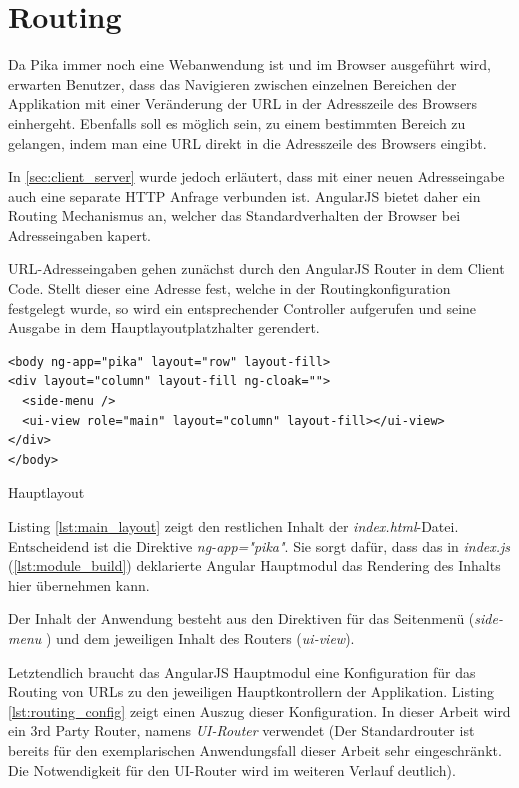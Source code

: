 \section{Routing}
\label{sec:routing}

Da Pika immer noch eine Webanwendung ist und im Browser ausgeführt wird, erwarten Benutzer, dass das Navigieren zwischen einzelnen Bereichen der Applikation mit einer Veränderung der URL in der Adresszeile des Browsers einhergeht. Ebenfalls soll es möglich sein, zu einem bestimmten Bereich zu gelangen, indem man eine URL direkt in die Adresszeile des Browsers eingibt.

In \ref{sec:client_server} wurde jedoch erläutert, dass mit einer neuen Adresseingabe auch eine separate HTTP Anfrage verbunden ist. AngularJS bietet daher ein Routing Mechanismus an, welcher das Standardverhalten der Browser bei Adresseingaben kapert.

URL-Adresseingaben gehen zunächst durch den AngularJS Router in dem Client Code. Stellt dieser eine Adresse fest, welche in der Routingkonfiguration festgelegt wurde, so wird ein entsprechender Controller aufgerufen und seine Ausgabe in dem Hauptlayoutplatzhalter gerendert.


\begin{listing}[H]
\begin{verbatim}
<body ng-app="pika" layout="row" layout-fill>
<div layout="column" layout-fill ng-cloak="">
  <side-menu />
  <ui-view role="main" layout="column" layout-fill></ui-view>
</div>
</body>
\end{verbatim}
\caption{Hauptlayout}
\label{lst:main_layout}
\end{listing}

Listing \ref{lst:main_layout} zeigt den restlichen Inhalt der \textit{index.html}-Datei. Entscheidend ist die Direktive \textit{ng-app="pika"}. Sie sorgt dafür, dass das in \textit{index.js} (\ref{lst:module_build}) deklarierte Angular Hauptmodul das Rendering des Inhalts hier übernehmen kann.

Der Inhalt der Anwendung besteht aus den Direktiven für das Seitenmenü (\textit{side-menu} ) und dem jeweiligen Inhalt des Routers (\textit{ui-view}).

Letztendlich braucht das AngularJS Hauptmodul eine Konfiguration für das Routing von URLs zu den jeweiligen Hauptkontrollern der Applikation. Listing \ref{lst:routing_config} zeigt einen Auszug dieser Konfiguration. In dieser Arbeit wird ein 3rd Party Router, namens \textit{UI-Router} verwendet (Der Standardrouter ist bereits für den exemplarischen Anwendungsfall dieser Arbeit sehr eingeschränkt. Die Notwendigkeit für den UI-Router wird im weiteren Verlauf deutlich).

